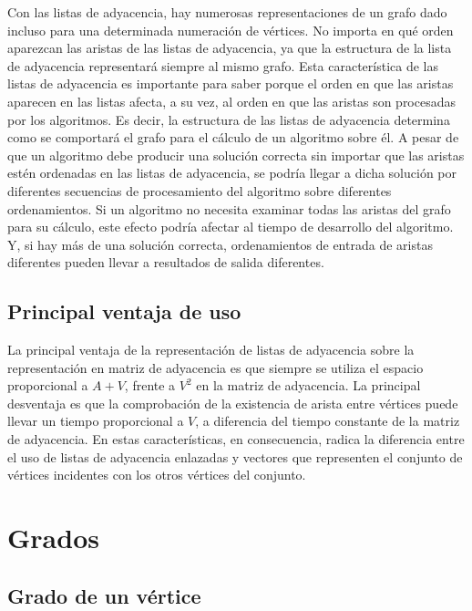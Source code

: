 Con las listas de adyacencia, hay numerosas representaciones de un grafo dado incluso para una determinada numeración de vértices. No importa en qué orden aparezcan las aristas de las listas de adyacencia, ya que la estructura de la lista de adyacencia representará siempre al mismo grafo. Esta característica de las listas de adyacencia es importante para saber porque el orden en que las aristas aparecen en las listas afecta, a su vez, al orden en que las aristas son procesadas por los algoritmos. Es decir, la estructura de las listas de adyacencia determina como se comportará el grafo para el cálculo de un algoritmo sobre él. A pesar de que un algoritmo debe producir una solución correcta sin importar que las aristas estén ordenadas en las listas de adyacencia, se podría llegar a dicha solución por diferentes secuencias de procesamiento del algoritmo sobre diferentes ordenamientos. Si un algoritmo no necesita examinar todas las aristas del grafo para su cálculo, este efecto podría afectar al tiempo de desarrollo del algoritmo. Y, si hay más de una solución correcta, ordenamientos de entrada de aristas diferentes pueden llevar a resultados de salida diferentes.\\

\subsection{Principal ventaja de uso}

La principal ventaja de la representación de listas de adyacencia sobre la representación en matriz de adyacencia es que siempre se utiliza el espacio proporcional a $A + V$, frente a $V^2$ en la matriz de adyacencia. La principal desventaja es que la comprobación de la existencia de arista entre vértices puede llevar un tiempo proporcional a $V$, a diferencia del tiempo constante de la matriz de adyacencia. En estas características, en consecuencia, radica la diferencia entre el uso de listas de adyacencia enlazadas y vectores que representen el conjunto de vértices incidentes con los otros vértices del conjunto. \\

\section{Grados}
\subsection{Grado de un vértice}

